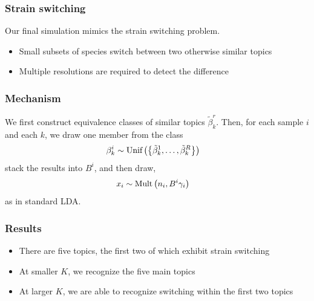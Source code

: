 \documentclass[hyperref={colorlinks=true, linkcolor=violet, citecolor=SeaGreen}]{beamer}
\begin{document}
\begin{frame}
  \frametitle{Strain switching}
  Our final simulation mimics the strain switching problem.
  \begin{itemize}
    \item Small subsets of species switch between two otherwise similar topics
    \item Multiple resolutions are required to detect the difference
  \end{itemize}
\end{frame}

\begin{frame}
\frametitle{Mechanism}
We first construct equivalence classes of similar topics $\tilde{\beta}_k^r$.
Then, for each sample $i$ and each $k$, we draw one member from the class
\begin{align*}
\beta_{k}^{i} &\sim \textnormal{Unif}\left(\left\{\tilde{\beta}_{k}^{1}, \dots, \tilde{\beta}_{k}^{R}\right\}\right)
\end{align*}
stack the results into $B^{i}$, and then draw,
\begin{align}
x_{i} &\sim \text{Mult}\left(n_{i}, B^{i}\gamma_{i}\right)
\end{align}
as in standard LDA.
\end{frame}

\begin{frame}
  \frametitle{Results}
  \begin{itemize}
    \item There are five topics, the first two of which exhibit strain switching
    \item At smaller $K$, we recognize the five main topics
    \item At larger $K$, we are able to recognize switching within the first two topics
  \end{itemize}

\begin{figure}
\end{figure}

\end{frame}
\end{document}
